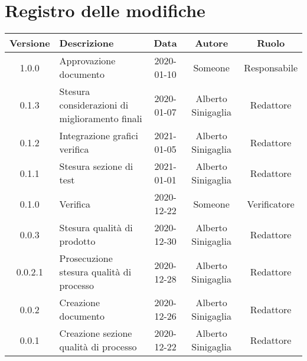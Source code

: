 \section*{Registro delle modifiche}

\begin{center}
	\begin{longtable}{|c|p{5cm}|c|c|c|}
	\hline
	\rowcolor{lighter-grayer}
	\textbf{Versione} & \textbf{Descrizione} & \textbf{Data} & \textbf{Autore} & \textbf{Ruolo} \\
	\hline
	\endfirsthead


	1.0.0 & Approvazione documento & 2020-01-10 & Someone & Responsabile \\
	\hline
	0.1.3 & Stesura considerazioni di miglioramento finali & 2020-01-07 & Alberto Sinigaglia & Redattore \\
	\hline
	0.1.2 &Integrazione grafici verifica & 2021-01-05 & Alberto Sinigaglia & Redattore \\
	\hline
	0.1.1 & Stesura sezione di test & 2021-01-01 & Alberto Sinigaglia & Redattore \\
	\hline
	0.1.0 & Verifica & 2020-12-22 & Someone & Verificatore \\
	\hline
	0.0.3 & Stesura qualità di prodotto & 2020-12-30 & Alberto Sinigaglia & Redattore \\
	\hline
	0.0.2.1 & Prosecuzione stesura qualità di processo & 2020-12-28 & Alberto Sinigaglia & Redattore \\
	\hline
	0.0.2 & Creazione documento & 2020-12-26 & Alberto Sinigaglia & Redattore \\
	\hline
	0.0.1 & Creazione sezione qualità di processo & 2020-12-22 & Alberto Sinigaglia & Redattore \\
	\hline

	\end{longtable}
\end{center}
